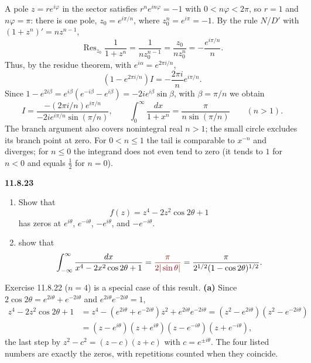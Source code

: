 A pole $z=re^{i\varphi}$ in the sector satisfies
$r^ne^{in\varphi}=-1$ with $0<n\varphi<2\pi$, so $r=1$ and
$n\varphi=\pi$: there is one pole, $z_0=e^{i\pi/n}$, where
$z_0^n=e^{i\pi}=-1$. By the rule $N/D'$ with $(1+z^n)'=nz^{n-1}$,
\[
\operatorname{Res}_{z_0}\frac1{1+z^n}
=\frac1{nz_0^{n-1}}
=\frac{z_0}{nz_0^n}=-\frac{e^{i\pi/n}}n.
\]
Thus, by the residue theorem, with $e^{i\alpha}=e^{2\pi i/n}$,
\[
(1-e^{2\pi i/n})I=-\frac{2\pi i}{n}e^{i\pi/n}.
\]
Since $1-e^{2i\beta}=e^{i\beta}(e^{-i\beta}-e^{i\beta})
=-2ie^{i\beta}\sin\beta$, with $\beta=\pi/n$ we obtain
\[
I=\frac{-(2\pi i/n)e^{i\pi/n}}{-2ie^{i\pi/n}\sin(\pi/n)},\qquad
\boxed{\int_0^\infty\frac{dx}{1+x^n}
=\frac{\pi}{n\sin(\pi/n)}\qquad(n>1)}.
\]
The branch argument also covers nonintegral real $n>1$; the small
circle excludes its branch point at zero. For $0<n\le1$ the tail
is comparable to $x^{-n}$ and diverges; for $n\le0$ the integrand does
not even tend to zero (it tends to $1$ for $n<0$ and equals $\frac12$
for $n=0$).

\par\bigskip
\noindent\textbf{11.8.23}\quad
\begin{enumerate}
\item[(a)] Show that
  \[
  f(z)=z^{4}-2z^{2}\cos2\theta+1
  \]
  has zeros at $e^{i\theta}$, $e^{-i\theta}$, $-e^{i\theta}$, and
  $-e^{-i\theta}$.
\item[(b)]  show that
  \[
  \int_{-\infty}^{\infty}\frac{dx}{x^{4}-2x^{2}\cos2\theta+1}
  =\erratum{\frac{\pi}{2|\sin\theta|}}
  =\frac{\pi}{2^{1/2}(1-\cos2\theta)^{1/2}}.
  \]
\end{enumerate}
Exercise 11.8.22 ($n=4$) is a special case of this result.
\solution
\textbf{(a)} Since $2\cos2\theta=e^{2i\theta}+e^{-2i\theta}$ and
$e^{2i\theta}e^{-2i\theta}=1$,
\[
\begin{aligned}
z^4-2z^2\cos2\theta+1
&=z^4-(e^{2i\theta}+e^{-2i\theta})z^2+e^{2i\theta}e^{-2i\theta}
=(z^2-e^{2i\theta})(z^2-e^{-2i\theta})\\
&=(z-e^{i\theta})(z+e^{i\theta})
(z-e^{-i\theta})(z+e^{-i\theta}),
\end{aligned}
\]
the last step by $z^2-c^2=(z-c)(z+c)$ with $c=e^{\pm i\theta}$.
The four listed numbers are exactly the zeros, with repetitions
counted when they coincide.

